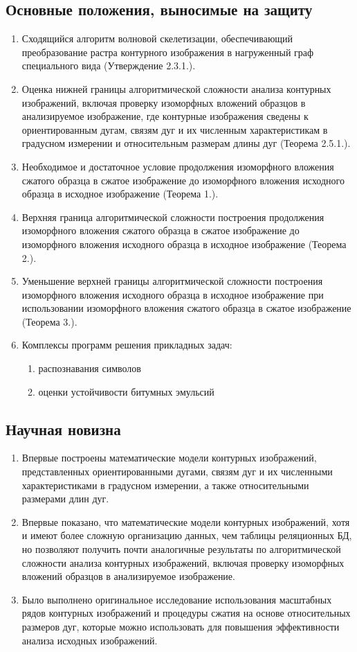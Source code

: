 \subsection*{Основные положения, выносимые на защиту}
\begin{enumerate}
	\item Сходящийся алгоритм волновой скелетизации,  обеспечивающий преобразование растра контурного изображения в нагруженный граф специального вида (Утверждение 2.3.1.).
	\item Оценка нижней границы алгоритмической сложности  анализа контурных изображений, включая проверку изоморфных вложений образцов в анализируемое изображение, где контурные изображения сведены к ориентированным дугам, связям дуг и их численным характеристикам в градусном измерении и  относительным размерам  длины дуг  (Теорема 2.5.1.).
	\item Необходимое и достаточное условие продолжения изоморфного вложения сжатого образца в сжатое изображение до изоморфного вложения исходного образца в исходное изображение  (Теорема 1.).
	\item Верхняя граница алгоритмической сложности построения продолжения изоморфного вложения сжатого образца в сжатое изображение до изоморфного вложения исходного образца в исходное изображение  (Теорема 2.).
	\item Уменьшение верхней границы алгоритмической сложности построения  изоморфного вложения исходного образца в исходное изображение при использовании изоморфного вложения сжатого образца в сжатое изображение  (Теорема 3.).
	\item Комплексы программ  решения прикладных задач:
	\begin{enumerate}
		\item распознавания символов
		\item оценки устойчивости битумных эмульсий
	\end{enumerate}
\end{enumerate}

\subsection*{Научная новизна}
\begin{enumerate}
	\item Впервые построены математические модели контурных изображений, представленных ориентированными дугами, связям дуг и их численными характеристиками в градусном измерении,  а также  относительными размерами  длин дуг.  
	\item Впервые  показано, что математические модели контурных изображений, хотя и имеют более сложную организацию данных, чем  таблицы реляционных БД, но позволяют получить почти аналогичные результаты по алгоритмической сложности  анализа контурных изображений, включая проверку изоморфных вложений образцов в анализируемое изображение.
	\item Было выполнено оригинальное исследование использования масштабных рядов контурных изображений и процедуры сжатия на  основе относительных размеров дуг, которые можно использовать для повышения эффективности анализа исходных изображений.
\end{enumerate}

